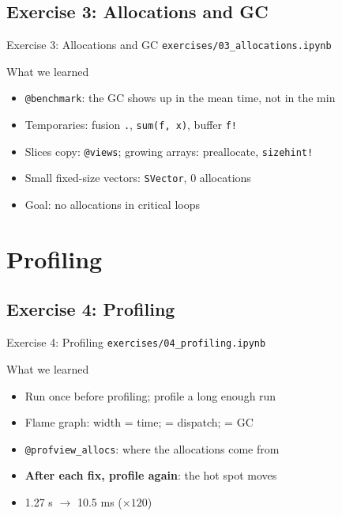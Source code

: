 \subsection{Exercise 3: Allocations and GC}

\begin{frame}{Exercise 3: Allocations and GC}
    \texttt{exercises/03\_allocations.ipynb}

    \pause\bigskip

    \begin{BlockGreen}{What we learned}
        \begin{itemize}
            \item \texttt{@benchmark}: the GC shows up in the mean time, not in the min
            \item Temporaries: fusion \texttt{.}, \texttt{sum(f, x)}, buffer \texttt{f!}
            \item Slices copy: \texttt{@views}; growing arrays: preallocate, \texttt{sizehint!}
            \item Small fixed-size vectors: \texttt{SVector}, 0 allocations
            \item \alert{Goal: no allocations in critical loops}
        \end{itemize}
    \end{BlockGreen}
\end{frame}


\section{Profiling}

\subsection{Exercise 4: Profiling}

\begin{frame}{Exercise 4: Profiling}
    \texttt{exercises/04\_profiling.ipynb}

    \pause\bigskip

    \begin{BlockGreen}{What we learned}
        \begin{itemize}
            \item Run once before profiling; profile a long enough run
            \item Flame graph: width = time;  = dispatch;  = GC
            \item \texttt{@profview\_allocs}: where the allocations come from
            \item \textbf{After each fix, profile again}: the hot spot moves
            \item 1.27 s \( \to \) 10.5 ms (\( \times 120 \))
        \end{itemize}
    \end{BlockGreen}
\end{frame}

